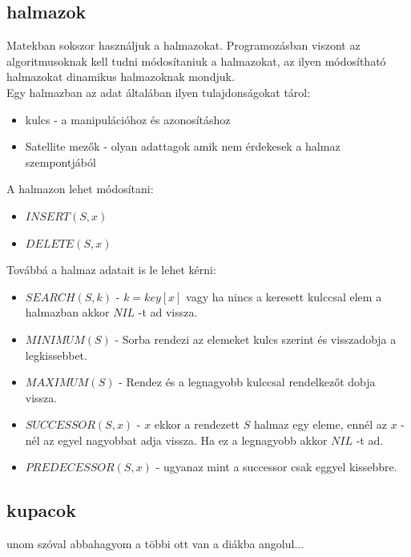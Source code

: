\documentclass{article}
\theoremstyle{mytheoremstyle}
\theoremstyle{mytheoremstyle}
\theoremstyle{myproblemstyle}
\begin{document}
\subsection{halmazok}
Matekban sokszor használjuk a halmazokat. 
Programozásban viszont az algoritmusoknak kell tudni módosítaniuk 
a halmazokat, az ilyen módosítható halmazokat dinamikus 
halmazoknak mondjuk.\\
Egy halmazban az adat általában ilyen tulajdonságokat tárol:
\begin{itemize}
    \item kulcs - a manipulációhoz és azonosításhoz
    \item Satellite mezők - olyan adattagok amik nem érdekesek a 
    halmaz szempontjából 
\end{itemize} 
A halmazon lehet módosítani:
\begin{itemize}
    \item $INSERT(S,x)$
    \item $DELETE(S,x)$
\end{itemize}
Továbbá a halmaz adatait is le lehet kérni:
\begin{itemize}
    \item $SEARCH(S,k)$ - $k = key[x]$ vagy ha nincs a keresett kulccsal elem a halmazban akkor $NIL$ -t ad vissza.
    \item $MINIMUM(S)$ - Sorba rendezi az elemeket kulcs szerint és visszadobja a legkissebbet.
    \item $MAXIMUM(S)$ - Rendez és a legnagyobb kulccsal rendelkezőt dobja vissza.
    \item $SUCCESSOR(S,x)$ - $x$ ekkor a rendezett $S$ halmaz egy eleme, 
    ennél az $x$ -nél az egyel nagyobbat adja vissza. Ha ez a legnagyobb akkor $NIL$ -t ad.
    \item $PREDECESSOR(S,x)$ - ugyanaz mint a successor csak eggyel kissebbre.
\end{itemize}
\subsection{kupacok}
unom szóval abbahagyom a többi ott van a diákba angolul...
\end{document}
